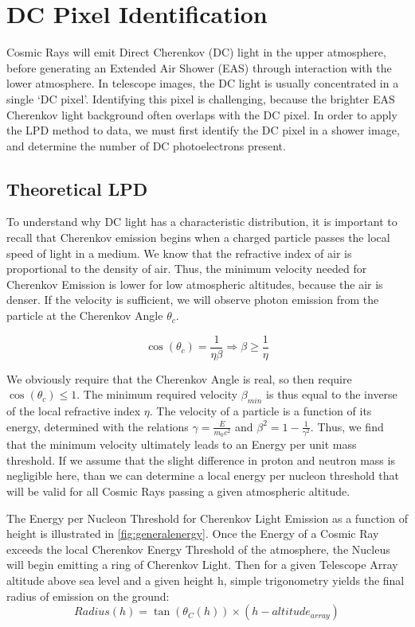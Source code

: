 \documentclass[11pt]{article}
\begin{document}
\section{DC Pixel Identification}
Cosmic Rays will emit Direct Cherenkov (DC) light in the upper atmosphere, before generating an Extended Air Shower (EAS) through interaction with the lower atmosphere. In telescope images, the DC light is usually concentrated in a single  \textquoteleft DC pixel'. Identifying this pixel is challenging, because the brighter EAS Cherenkov light background often overlaps with the DC pixel. In order to apply the LPD method to data, we must first identify the DC pixel in a shower image, and determine the number of DC photoelectrons present. 

\subsection{Theoretical LPD}
To understand why DC light has a characteristic distribution, it is important to recall that Cherenkov emission begins when a charged particle passes the local speed of light in a medium.  We know that the refractive index of air is proportional to the density of air. Thus, the minimum velocity needed for Cherenkov Emission is lower for low atmospheric altitudes, because the air is denser. If the velocity is sufficient, we will observe photon emission from the particle at the Cherenkov Angle $\theta_{c}$.

\[ \cos(\theta_{c}) = \frac{1}{\eta \beta}  \Longrightarrow \beta \geq \frac{1}{\eta}\]

We obviously require that the Cherenkov Angle is real, so then require $\cos(\theta_{c}) \leq 1$. The minimum required velocity $\beta_{min}$ is thus equal to the inverse of the local refractive index $\eta$. The velocity of a particle is a function of its energy, determined with the relations $\gamma = \frac{E}{m_{0} c^{2}}$ and $\beta^{2} = 1 - \frac{1}{\gamma ^{2}}$. Thus, we find that the minimum velocity ultimately leads to an Energy per unit mass threshold. If we assume that the slight difference in proton and neutron mass is negligible here, than we can determine a local energy per nucleon threshold that will be valid for all Cosmic Rays passing a given atmospheric altitude. 

The Energy per Nucleon Threshold for Cherenkov Light Emission as a function of height is illustrated in \ref{fig:generalenergy}. Once the Energy of a Cosmic Ray exceeds the local Cherenkov Energy Threshold of the atmosphere, the Nucleus will begin emitting a ring of Cherenkov Light.  Then for a given Telescope Array altitude above sea level and a given height h, simple trigonometry yields the final radius of emission on the ground:
\[ Radius(h) = \tan (\theta_{C}(h)) \times (h - altitude_{array})\]
\end{document}
